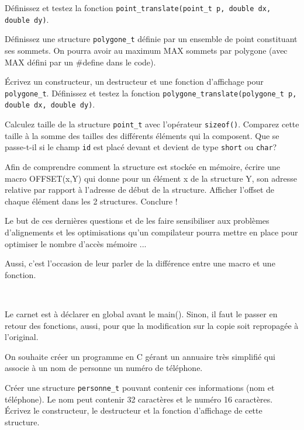 \documentclass[10pt]{article}\usepackage[correction,nu]{esial}
\begin{document}
\Question Définissez et testez la fonction
\texttt{point\_translate(point\_t p, double dx, double dy)}.

\Question Définissez une structure \texttt{polygone\_t} définie par un
ensemble de point constituant ses sommets. On pourra avoir au maximum
MAX sommets par polygone (avec MAX défini par un \#define dans le code).

\Question Écrivez un constructeur, un destructeur et une fonction
d'affichage pour \texttt{polygone\_t}.  Définissez et testez la
fonction \texttt{polygone\_translate(polygone\_t p, double dx, double
  dy)}.

\Question Calculez taille de la structure \texttt{point\_t} avec
l'opérateur \texttt{sizeof()}. Comparez cette taille à la somme des
tailles des différents éléments qui la composent. Que se passe-t-il si
le champ \texttt{id} est placé devant et devient de type
\texttt{short} ou \texttt{char}? 

\Question Afin de comprendre comment la structure est stockée en
mémoire, écrire une macro OFFSET(x,Y) qui donne pour un élément x de
la structure Y, son adresse relative par rapport à l'adresse de début
de la structure. Afficher l'offset de chaque élément dans les 2
structures. Conclure !

\begin{Reponse}
Le but de ces dernières questions et de les faire sensibiliser aux
problèmes d'alignements et les optimisations qu'un compilateur pourra
mettre en place pour optimiser le nombre d'accès mémoire ...

Aussi, c'est l'occasion de leur parler de la différence entre une
macro et une fonction.
\end{Reponse}

\bigskip\bigskip\Exercice
~
\begin{Reponse}
  Le carnet est à déclarer en global avant le main(). Sinon, il faut
  le passer en retour des fonctions, aussi, pour que la modification
  sur la copie soit repropagée à l'original.
\end{Reponse}

On souhaite créer un programme en C gérant un annuaire très simplifié qui
associe à un nom de personne un numéro de téléphone.

\Question Créer une structure \texttt{personne\_t} pouvant contenir
ces informations (nom et téléphone). Le nom peut contenir 32
caractères et le numéro 16 caractères. Écrivez le constructeur, le
destructeur et la fonction d'affichage de cette structure.
\end{document}
